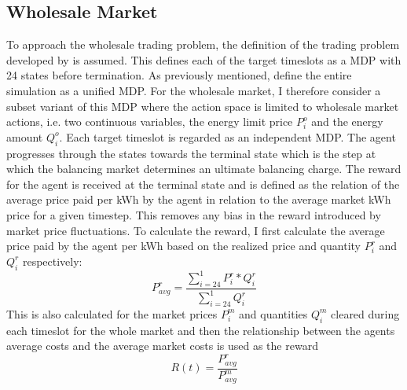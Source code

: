 
\subsection{Wholesale Market}
\label{sub:wholesale_market}

To approach the wholesale trading problem, the definition of the trading problem developed by
\citet{tactexurieli2016mdp} is assumed. This defines each of the target timeslots as a \ac{MDP} with 24 states before
termination. As previously mentioned, \citet{tactexurieli2016mdp} define the entire simulation as a unified \ac{MDP}.
For the wholesale market, I therefore consider a subset variant of this \ac{MDP} where the action space is limited to
wholesale market actions, i.e.
two continuous variables, the energy limit price $P^o_i$ and the energy amount $Q^o_i$. Each target timeslot is regarded as
an independent \ac{MDP}. The agent progresses through the states towards the terminal state which is the step at which
the balancing market determines an ultimate balancing charge. The reward for the agent is received at the terminal state
and is defined as the relation of the average price paid per \ac{kWh} by the agent in relation to the average market
\ac{kWh}
price for a given timestep. This removes any bias in the reward introduced by market price fluctuations. To calculate
the reward, I first calculate the average price paid by the agent per \ac{kWh} based on the realized price and quantity
$P^r_i$ and $Q^r_i$ respectively:
\begin{equation}
    \label{eq:Average price per kWh for a given target timeslot}
    P^{r}_{avg} =\frac{\sum ^{1}_{i=24} P^{r}_{i} *Q^{r}_{i}}{\sum ^{1}_{i=24} Q^{r}_{i}}


\end{equation}
This is also calculated for the market prices $P^m_{i}$ and quantities $Q^m_i$ cleared during each timeslot for the whole market and then the
relationship between the agents average costs and the average market costs is used as the reward
\begin{equation}
R(t) = \frac{P^r_{avg}}{P^m_{avg}}
\end{equation}


